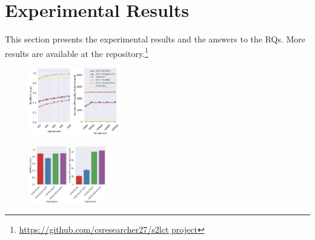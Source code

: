 \section{Experimental Results}
\label{sec:result}

This section presents the experimental results and the answers to the RQs. 
More results are available at the \tool repository.\footnote{\href{https://github.com/csresearcher27/s2lct_project}{https://github.com/csresearcher27/s2lct$\_$project}} 


\begin{figure}
    \centering
    \includegraphics[width=0.35\textwidth]{figs/pdr-selfbleu-agg-lc-task-agg-lineplot.eps}
    \vspace{-3mm}
    \caption{\PdrSelfbleuFigCaption}
\end{figure}

\begin{figure}
    \centering
    \includegraphics[width=0.3\textwidth]{figs/pdr-selfbleu-ablation-lc-task-agg-barplot.eps}
    \vspace{-3mm}
    \caption{\PdrSelfbleuBarplotFigCaption}
\end{figure}





